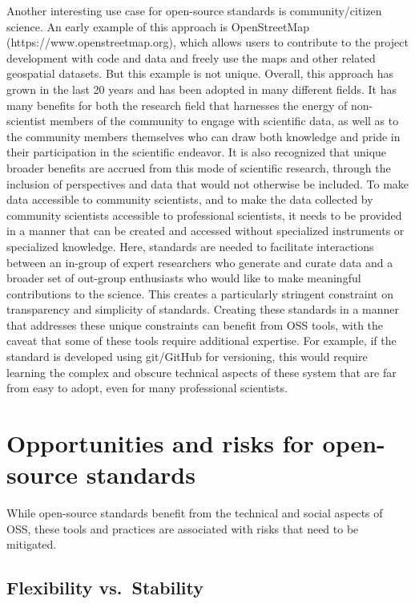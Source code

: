 \documentclass[
  letterpaper,
  DIV=11,
  numbers=noendperiod]{scrartcl}
\begin{document}
Another interesting use case for open-source standards is
community/citizen science. An early example of this approach is
OpenStreetMap (https://www.openstreetmap.org), which allows users to
contribute to the project development with code and data and freely use
the maps and other related geospatial datasets. But this example is not
unique. Overall, this approach has grown in the last 20 years and has
been adopted in many different fields. It has many benefits for both the
research field that harnesses the energy of non-scientist members of the
community to engage with scientific data, as well as to the community
members themselves who can draw both knowledge and pride in their
participation in the scientific endeavor. It is also recognized that
unique broader benefits are accrued from this mode of scientific
research, through the inclusion of perspectives and data that would not
otherwise be included. To make data accessible to community scientists,
and to make the data collected by community scientists accessible to
professional scientists, it needs to be provided in a manner that can be
created and accessed without specialized instruments or specialized
knowledge. Here, standards are needed to facilitate interactions between
an in-group of expert researchers who generate and curate data and a
broader set of out-group enthusiasts who would like to make meaningful
contributions to the science. This creates a particularly stringent
constraint on transparency and simplicity of standards. Creating these
standards in a manner that addresses these unique constraints can
benefit from OSS tools, with the caveat that some of these tools require
additional expertise. For example, if the standard is developed using
git/GitHub for versioning, this would require learning the complex and
obscure technical aspects of these system that are far from easy to
adopt, even for many professional scientists.

\section{Opportunities and risks for open-source
standards}\label{sec-challenges}

While open-source standards benefit from the technical and social
aspects of OSS, these tools and practices are associated with risks that
need to be mitigated.

\subsection{Flexibility vs.~Stability}\label{flexibility-vs.-stability}
\end{document}
